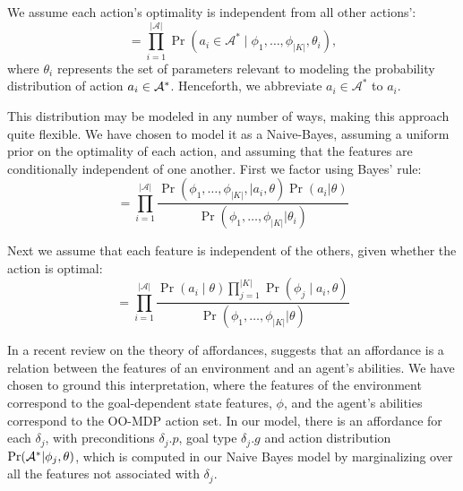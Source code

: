 \documentclass[conference]{IEEEtran}
\newcommand{\jnote}[1]{\textcolor{Orange}{\textbf{}}}
\begin{document}
We assume each action's optimality is independent from all other actions':
\begin{equation}
= \prod_{i=1}^{|\mathcal{A}|} \Pr(a_i \in \mathcal{A}^* \mid \phi_1, \ldots, \phi_{|K|}, \theta_i),
\label{eq:action_independ}
\end{equation}
where $\theta_i$ represents the set of parameters relevant to modeling the probability distribution of action $a_i \in {\cal A}^*$. Henceforth, we abbreviate $a_i \in \mathcal{A}^*$ to $a_i$.

This distribution may be modeled in any number of ways, making this approach quite flexible.
We have chosen to model it as a Naive-Bayes, assuming a uniform prior
on the optimality of each action, and assuming that the features are
conditionally independent of one another.  First we factor using Bayes' rule:
\begin{equation}
= \prod_{i=1}^{|\mathcal{A}|} \frac{\Pr(\phi_1, \ldots, \phi_{|K|}, \mid a_i, \theta) \Pr(a_i | \theta)}{\Pr(\phi_1, \ldots, \phi_{|K|} | \theta_i)}
\label{eq:bayes}
\end{equation}

Next we assume that each feature is independent of the others, given
whether the action is optimal:
\begin{equation}
= \prod_{i=1}^{|\mathcal{A}|} \frac{\Pr(a_i \mid \theta) \prod_{j=1}^{|K|} \Pr(\phi_j \mid a_i, \theta) }{\Pr(\phi_1, \ldots, \phi_{|K|} | \theta)}
\label{eq:final}
\end{equation}
\jnote{I'm somewhat inclined to not write down the Naive Bayes derivation and just say ``We have chosen a Naive-Bayes model which treats each feature as indepdent of each other given whether the action was optimal or not''}

In a recent review on the theory of affordances, \citet{chemero2003} suggests that an affordance is a relation between the features of an environment and an agent's abilities. We have chosen to ground this interpretation, where
the features of the environment correspond to the goal-dependent state features, $\phi$, and the agent's abilities correspond to the OO-MDP action set. In our model, there is an affordance for each $\delta_j$, with preconditions $\delta_j.p$, goal type $\delta_j.g$ and action distribution $\Pr({\cal A}^* | \phi_j, \theta)$, which is computed in our Naive Bayes model by marginalizing over all the features not associated with $\delta_j$.
\end{document}
